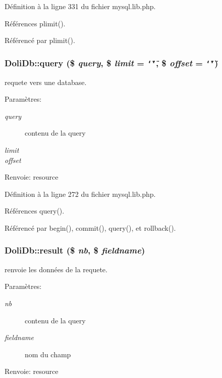 D\'{e}finition \`{a} la ligne 331 du fichier mysql.lib.php.

R\'{e}f\'{e}rences plimit().

R\'{e}f\'{e}renc\'{e} par plimit().\hypertarget{classDoliDb_a10}{
\subsubsection[query]{\setlength{\rightskip}{0pt plus 5cm}Doli\-Db::query (\$ {\em query}, \$ {\em limit} = {\tt \char`\"{}\char`\"{}}, \$ {\em offset} = {\tt \char`\"{}\char`\"{}})}}
\label{classDoliDb_a10}


requete vers une database. 

\begin{Desc}
\item[Param\`{e}tres:]
\begin{description}
\item[{\em query}]contenu de la query \item[{\em limit}]\item[{\em offset}]\end{description}
\end{Desc}
\begin{Desc}
\item[Renvoie:]resource \end{Desc}


D\'{e}finition \`{a} la ligne 272 du fichier mysql.lib.php.

R\'{e}f\'{e}rences query().

R\'{e}f\'{e}renc\'{e} par begin(), commit(), query(), et rollback().\hypertarget{classDoliDb_a12}{
\subsubsection[result]{\setlength{\rightskip}{0pt plus 5cm}Doli\-Db::result (\$ {\em nb}, \$ {\em fieldname})}}
\label{classDoliDb_a12}


renvoie les donn\'{e}es de la requete. 

\begin{Desc}
\item[Param\`{e}tres:]
\begin{description}
\item[{\em nb}]contenu de la query \item[{\em fieldname}]nom du champ \end{description}
\end{Desc}
\begin{Desc}
\item[Renvoie:]resource \end{Desc}


